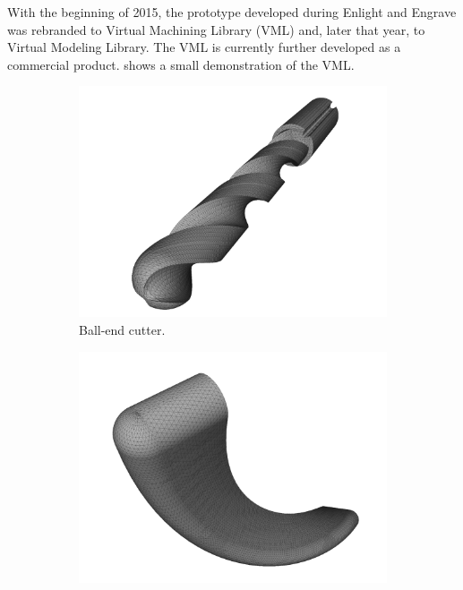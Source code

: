 With the beginning of 2015, the prototype developed during Enlight and Engrave was rebranded to Virtual Machining Library (VML) and, later that year, to Virtual Modeling Library.
The VML is currently further developed as a commercial product.
 shows a small demonstration of the VML.

\begin{figure}[h]
	\centering
		\begin{subfigure}[t]{0.32\textwidth}
			\centering
			\includegraphics[width=\textwidth]{images/hq_impeller_tool}
			\caption{Ball-end cutter.}
			\label{fig:hq_impeller_tool}
		\end{subfigure}
		\begin{subfigure}[t]{0.32\textwidth}
			\centering
			\includegraphics[width=\textwidth]{images/hq_impeller_swept}

\end{subfigure}
\end{figure}
